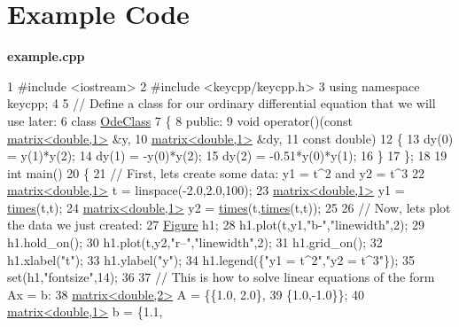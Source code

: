 \section*{\label{_example}%
Example Code}

{\bfseries {\ttfamily example.\-cpp}} 
\begin{DoxyCodeInclude}
1 \textcolor{preprocessor}{#include <iostream>}
2 \textcolor{preprocessor}{#include <keycpp/keycpp.h>}
3 \textcolor{keyword}{using namespace }keycpp;
4 
5 \textcolor{comment}{// Define a class for our ordinary differential equation that we will use later:}
6 \textcolor{keyword}{class }\hyperlink{class_ode_class}{OdeClass}
7 \{
8     \textcolor{keyword}{public}:
9         \textcolor{keywordtype}{void} operator()(\textcolor{keyword}{const} \hyperlink{classkeycpp_1_1matrix}{matrix<double,1>} &y,
10                         \hyperlink{classkeycpp_1_1matrix}{matrix<double,1>} &dy,
11                         \textcolor{keyword}{const} \textcolor{keywordtype}{double})
12         \{
13             dy(0) = y(1)*y(2);
14             dy(1) = -y(0)*y(2);
15             dy(2) = -0.51*y(0)*y(1);
16         \}
17 \};
18 
19 \textcolor{keywordtype}{int} main()
20 \{
21     \textcolor{comment}{// First, lets create some data: y1 = t^2 and y2 = t^3}
22     \hyperlink{classkeycpp_1_1matrix}{matrix<double,1>} t = linspace(-2.0,2.0,100);
23     \hyperlink{classkeycpp_1_1matrix}{matrix<double,1>} y1 = \hyperlink{namespacekeycpp_a23a0fd48168263aad7f77f1769dc2f2a}{times}(t,t);
24     \hyperlink{classkeycpp_1_1matrix}{matrix<double,1>} y2 = \hyperlink{namespacekeycpp_a23a0fd48168263aad7f77f1769dc2f2a}{times}(t,\hyperlink{namespacekeycpp_a23a0fd48168263aad7f77f1769dc2f2a}{times}(t,t));
25 
26     \textcolor{comment}{// Now, lets plot the data we just created:}
27     \hyperlink{classkeycpp_1_1_figure}{Figure} h1;
28     h1.plot(t,y1,\textcolor{stringliteral}{"b-"},\textcolor{stringliteral}{"linewidth"},2);
29     h1.hold\_on();
30     h1.plot(t,y2,\textcolor{stringliteral}{"r--"},\textcolor{stringliteral}{"linewidth"},2);
31     h1.grid\_on();
32     h1.xlabel(\textcolor{stringliteral}{"t"});
33     h1.ylabel(\textcolor{stringliteral}{"y"});
34     h1.legend(\{\textcolor{stringliteral}{"y1 = t^2"},\textcolor{stringliteral}{"y2 = t^3"}\});
35     \textcolor{keyword}{set}(h1,\textcolor{stringliteral}{"fontsize"},14);
36 
37     \textcolor{comment}{// This is how to solve linear equations of the form Ax = b:}
38     \hyperlink{classkeycpp_1_1matrix}{matrix<double,2>} A = \{\{1.0, 2.0\},
39                           \{1.0,-1.0\}\};
40     \hyperlink{classkeycpp_1_1matrix}{matrix<double,1>} b = \{1.1,

\end{DoxyCodeInclude}
